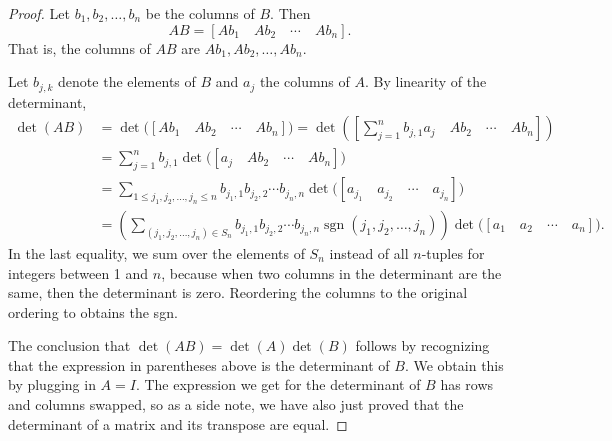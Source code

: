 \begin{proof}
Let $b_1,b_2,\ldots,b_n$ be the columns of $B$.  Then
\begin{equation*}
AB = [ Ab_1 \quad Ab_2 \quad  \cdots \quad  Ab_n ] .
\end{equation*}
That is, the columns of $AB$ are
$Ab_1,Ab_2,\ldots,Ab_n$.

Let $b_{j,k}$ denote the elements of $B$ and
$a_j$ the columns of $A$.
By linearity of the determinant,
\begin{equation*}
\begin{split}
\det(AB) & =  
\det \bigl([ Ab_1 \quad Ab_2 \quad  \cdots \quad  Ab_n ] \bigr) =
\det \left(\left[ \sum_{j=1}^n b_{j,1} a_j \quad Ab_2 \quad  \cdots \quad  Ab_n \right]\right) \\
& =
\sum_{j=1}^n
b_{j,1}
\det \bigl([ a_j \quad Ab_2 \quad  \cdots \quad  Ab_n ]\bigr) \\
& =
\sum_{1 \leq j_1,j_2,\ldots,j_n \leq n}
b_{j_1,1}
b_{j_2,2}
\cdots
b_{j_n,n}
\det \bigl([ a_{j_1} \quad a_{j_2} \quad  \cdots \quad  a_{j_n} ]\bigr) \\
& =
\left(
\sum_{(j_1,j_2,\ldots,j_n) \in S_n}
b_{j_1,1}
b_{j_2,2}
\cdots
b_{j_n,n}
\operatorname{sgn}(j_1,j_2,\ldots,j_n)
\right)
\det \bigl([ a_{1} \quad a_{2} \quad  \cdots \quad  a_{n} ]\bigr) .
\end{split}
\end{equation*}
In the last equality, we sum over the elements of $S_n$
instead of all $n$-tuples for integers between 1 and $n$,
because
when two columns in the determinant are the same, then the
determinant is zero.  Reordering the columns to the
original ordering to obtains the sgn.

The conclusion that $\det(AB) = \det(A)\det(B)$
follows by recognizing that the expression in parentheses above is the determinant of $B$.  
We obtain this by plugging in $A=I$.
The expression we get for the determinant of $B$ has rows and columns
swapped, so as a side note, we have also just proved that the determinant of
a matrix and its transpose are equal.


\end{proof}
